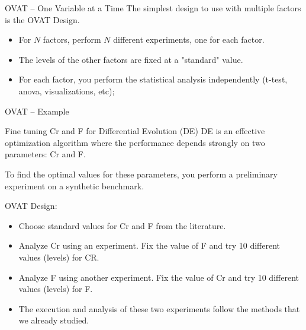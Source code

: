 \begin{frame}{OVAT -- One Variable at a Time}
  The simplest design to use with multiple factors is the OVAT Design.\bigskip

  \begin{itemize}
    \item For $N$ factors, perform $N$ different experiments, one for each factor.
    \item The levels of the other factors are fixed at a "standard" value.
    \item For each factor, you perform the statistical analysis independently (t-test, anova, visualizations, etc);
  \end{itemize}
\end{frame}

\begin{frame}{OVAT -- Example}
  \begin{block}{Fine tuning Cr and F for Differential Evolution (DE)}
    DE is an effective optimization algorithm where the performance depends
    strongly on two parameters: Cr and F.\bigskip

    To find the optimal values for these parameters, you perform a preliminary
    experiment on a synthetic benchmark.
  \end{block}

  OVAT Design:
  \begin{itemize}
    \item Choose standard values for Cr and F from the literature.
    \item Analyze Cr using an experiment. Fix the value of F and try 10
      different values (levels) for CR.
    \item Analyze F using another experiment. Fix the value of Cr and try 10
      different values (levels) for F.
    \item The execution and analysis of these two experiments follow the
      methods that we already studied.
  \end{itemize}
\end{frame}




























%
